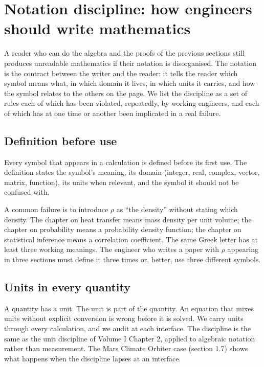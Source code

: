 \section{Notation discipline: how engineers should write
mathematics}

A reader who can do the algebra and the proofs of the previous
sections still produces unreadable mathematics if their notation is
disorganised. The notation is the contract between the writer and
the reader: it tells the reader which symbol means what, in which
domain it lives, in which units it carries, and how the symbol
relates to the others on the page. We list the discipline as a set
of rules each of which has been violated, repeatedly, by working
engineers, and each of which has at one time or another been
implicated in a real failure.

\subsection{Definition before use}

Every symbol that appears in a calculation is defined before its
first use. The definition states the symbol's meaning, its domain
(integer, real, complex, vector, matrix, function), its units when
relevant, and the symbol it should not be confused with.

A common failure is to introduce $\rho$ as ``the density'' without
stating which density. The chapter on heat transfer means mass
density per unit volume; the chapter on probability means a
probability density function; the chapter on statistical inference
means a correlation coefficient. The same Greek letter has at least
three working meanings. The engineer who writes a paper with $\rho$
appearing in three sections must define it three times or, better,
use three different symbols.

\subsection{Units in every quantity}

A quantity has a unit. The unit is part of the quantity. An equation
that mixes units without explicit conversion is wrong before it is
solved. We carry units through every calculation, and we audit at
each interface. The discipline is the same as the unit discipline of
Volume I Chapter 2, applied to algebraic notation rather than
measurement. The Mars Climate Orbiter case (section 1.7) shows what
happens when the discipline lapses at an interface.

